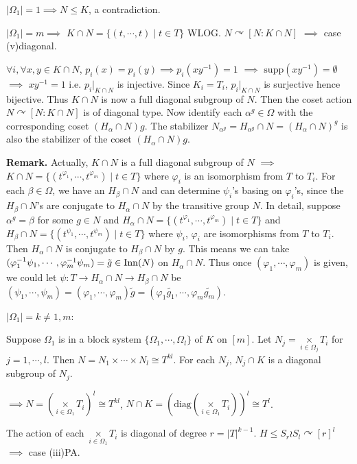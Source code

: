 \documentclass[a4paper,11pt]{article}
\begin{document}
$|\Omega_1|=1\implies N\leq K$, a contradiction.

$|\Omega_1|=m\implies$ $K\cap N=\{(t,\cdots,t)\mid t\in T\}$ WLOG.  $N\curvearrowright [N:K\cap N]$ $\implies$ case (v)diagonal.

{\color{gray}
$\forall i, \forall x, y \in K\cap N$, $p_i(x)=p_i(y)\implies p_i(xy^{-1})=1$ $\implies$ $\mathrm{supp}(xy^{-1})=\emptyset$ $\implies$ $xy^{-1}=1$ i.e. $p_i|_{K\cap N}$ is injective. Since $K_i=T_i$, $p_i|_{K\cap N}$ is surjective hence bijective. Thus $K\cap N$ is now a full diagonal subgroup of $N$. Then the coset action $N\curvearrowright [N:K\cap N]$ is of diagonal type. Now identify each $\alpha^g\in\Omega$ with the corresponding coset $(H_\alpha\cap N)g$. The stabilizer $N_{\alpha^g}=H_{\alpha^g}\cap N=(H_\alpha\cap N)^g$ is also the stabilizer of the coset $(H_\alpha\cap N)g$.
}

{\color{lightgray}
\textbf{Remark. } Actually, $K\cap N$ is a full diagonal subgroup of $N$ $\implies$ $K\cap N=\{(t^{\varphi_1},\cdots,t^{\varphi_m})\mid t\in T\}$ where $\varphi_i$ is an isomorphism from $T$ to $T_i$. For each $\beta\in\Omega$, we have an $H_\beta\cap N$ and can determine $\psi_i$'s basing on $\varphi_i$'s, since the $H_\beta\cap N$'s are conjugate to $H_\alpha\cap N$ by the transitive group $N$. In detail, suppose $\alpha^g=\beta$ for some $g\in N$ and $H_\alpha\cap N=\{(t^{\varphi_1},\cdots,t^{\varphi_m})\mid t\in T\}$ and $H_\beta\cap N=\{(t^{\psi_1},\cdots,t^{\psi_m})\mid t\in T\}$ where $\psi_i$, $\varphi_i$ are isomorphisms from $T$ to $T_i$. Then $H_\alpha\cap N$ is conjugate to $H_\beta\cap N$ by $g$. This means we can take $(\varphi_1^{-1}\psi_1,\cdots,\varphi_m^{-1}\psi_m)=\tilde{g}\in \mathrm{Inn}(N)$ on $H_\alpha\cap N$. Thus once $(\varphi_1,\cdots,\varphi_m)$ is given, we could let $\psi: T\to H_\alpha\cap N\to H_\beta\cap N$ be $(\psi_1,\cdots,\psi_m)=(\varphi_1,\cdots,\varphi_m)\tilde{g}=(\varphi_1\tilde{g_1},\cdots,\varphi_m \tilde{g_m})$.
}


$|\Omega_1|=k\neq 1,m$:

Suppose $\Omega_1$ is in a block system $\{\Omega_1,\cdots,\Omega_l\}$ of $K$ on $[m]$. Let $N_j=\mathop{\times}\limits_{i\in\Omega_j}T_i$ for $j=1,\cdots,l$. Then $N=N_1\times\cdots\times N_l\cong T^{kl}$. For each $N_j$, $N_j\cap K$ is a diagonal subgroup of $N_j$.

$\implies N=\left(\mathop{\times}\limits_{i\in\Omega_1}T_i\right)^{l}\cong T^{kl}$, $N\cap K=\left(\mathrm{diag}\left(\mathop{\times}\limits_{i\in\Omega_1}T_i\right)\right)^l\cong T^l$.

The action of each $\mathop{\times}\limits_{i\in\Omega_1}T_i$ is diagonal of degree $r=|T|^{k-1}$. $H\leq S_r\wr S_l\curvearrowright [r]^l$ $\implies$ case (iii)PA.





\ifx\ChapTwoSecSix\undefined
     
\end{document}
